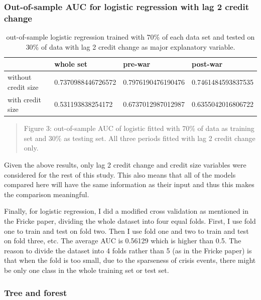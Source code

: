 \documentclass{article}
\newcommand{\ciapdf}[1]{\vspace*{-\parskip}\begin{center}\resizebox{0.75\textwidth}{!}{\texttt{[image: \#1]}}\end{center}}
\begin{document}
\subsubsection*{\centering{}Out-of-sample AUC for logistic regression with lag 2 credit change}

\begin{table}[H]
    \caption{out-of-sample logistic regression trained with 70\% of
    each data set and tested on 30\% of data with lag 2 credit change
    as major explanatory variable.
    }
    \begin{center}\begin{tabular}{|l|l|l|l|}
    \hline
                        & whole set          & pre-war            & post-war           \\ \hline
    without credit size & 0.7370988446726572 & 0.7976190476190476 & 0.7461484593837535 \\ \hline
    with credit size    & 0.531193838254172  & 0.6737012987012987 & 0.6355042016806722 \\ \hline
    \end{tabular}\end{center}
\end{table}

\ciapdf{Figure_4.pdf}
\begin{quote}
Figure 3: out-of-sample AUC of logistic fitted with 70\% of
data as training set and 30\% as testing set. All three periods
fitted with lag 2 credit change only.
\end{quote}

Given the above results, only lag 2 credit change and credit
size variables were considered for the rest of this study. This also means that all of the models
compared here will have the
same information as their input and thus this makes the comparison meaningful.

Finally, for logistic regression, I did a modified cross validation as
mentioned in the Fricke paper, dividing the whole dataset into four
equal folds. First, I use fold one to train and test on fold two. Then I
use fold one and two to train and test on fold three, etc. The average
AUC is 0.56129 which is higher than 0.5. The reason to divide the
dataset into 4 folds rather than 5 (as in the Fricke paper) is that
when the fold is too small, due to the sparseness of crisis events,
there might be only one class in the whole training set or test set.

\subsubsection*{Tree and forest}
\end{document}
